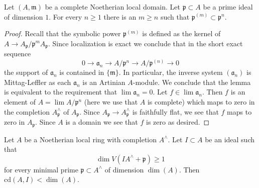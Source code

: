 \begin{lemma}
\label{lemma-inverse-system-symbolic-powers}
Let $(A, \mathfrak m)$ be a complete Noetherian local domain. Let
$\mathfrak p \subset A$ be a prime ideal of dimension $1$.
For every $n \geq 1$ there is an $m \geq n$ such that
$\mathfrak p^{(m)} \subset \mathfrak p^n$.
\end{lemma}

\begin{proof}
Recall that the symbolic power $\mathfrak p^{(m)}$ is defined as the
kernel of $A \to A_\mathfrak p/\mathfrak p^mA_\mathfrak p$.
Since localization is exact we conclude that in the short exact sequence
$$
0 \to \mathfrak a_n \to A/\mathfrak p^n \to A/\mathfrak p^{(n)} \to 0
$$
the support of $\mathfrak a_n$ is contained in $\{\mathfrak m\}$.
In particular, the inverse system $(\mathfrak a_n)$ is Mittag-Leffler
as each $\mathfrak a_n$ is an Artinian $A$-module.
We conclude that the lemma is equivalent to the requirement
that $\lim \mathfrak a_n = 0$. Let $f \in \lim \mathfrak a_n$.
Then $f$ is an element of $A = \lim A/\mathfrak p^n$
(here we use that $A$ is complete)
which maps to zero in the completion $A_\mathfrak p^\wedge$
of $A_\mathfrak p$. Since $A_\mathfrak p \to A_\mathfrak p^\wedge$
is faithfully flat, we see that $f$ maps to zero in $A_\mathfrak p$.
Since $A$ is a domain we see that $f$ is zero as desired.
\end{proof}

\begin{proposition}
\label{proposition-Hartshorne-Lichtenbaum-vanishing}
\begin{reference}
\cite[Theorem 3.1]{CD}
\end{reference}
Let $A$ be a Noetherian local ring with completion $A^\wedge$.
Let $I \subset A$ be an ideal such that
$$
\dim V(IA^\wedge + \mathfrak p) \geq 1
$$
for every minimal prime $\mathfrak p \subset A^\wedge$ of dimension $\dim(A)$.
Then $\text{cd}(A, I) < \dim(A)$.
\end{proposition}


